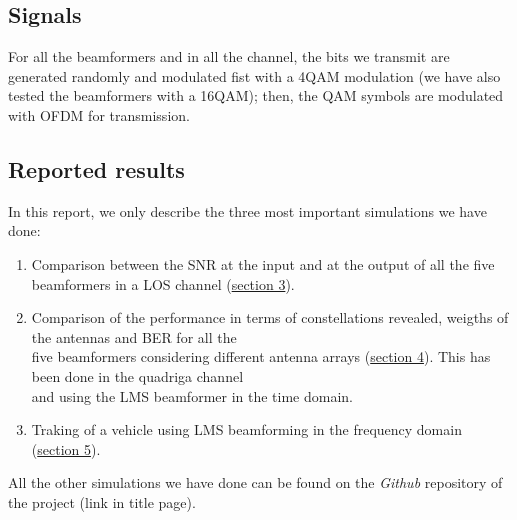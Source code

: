\subsection{Signals}

For all the beamformers and in all the channel, the bits we transmit are generated randomly and modulated fist with a 4\-QAM 
modulation (we have also tested the beamformers with a 16\-QAM); then, the QAM symbols are modulated with OFDM for transmission.

\subsection{Reported results}

In this report, we only describe the three most important simulations we have done:

\begin{enumerate}
    \item Comparison between the SNR at the input and at the output of all the five beamformers in a LOS channel (\hyperref[sec:snr_comparison]{section 3}).
    \item Comparison of the performance in terms of constellations revealed, weigths of the antennas and BER for all the \\ 
            five beamformers considering different antenna arrays (\hyperref[sec:antenna_array_comparison]{section 4}). This has been done in the quadriga channel \\ 
            and using the LMS beamformer in the time domain.
    \item Traking of a vehicle using LMS beamforming in the frequency domain (\hyperref[sec:tracking]{section 5}).
\end{enumerate}

All the other simulations we have done can be found on the \textit{Github} repository of the project (link in title page).